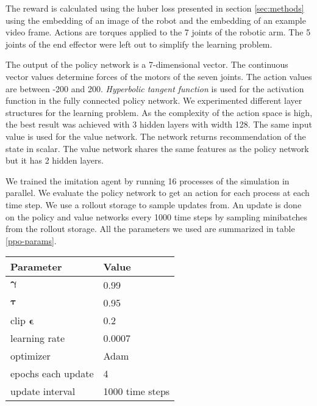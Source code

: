 The reward is calculated using the huber loss presented in section \ref{sec:methods} using the embedding of an image of the robot and the embedding of an example video frame. Actions are torques applied to the 7 joints of the robotic arm. The 5 joints of the end effector were left out to simplify the learning problem.  

The output of the policy network is a 7-dimensional vector. The continuous vector values determine forces of the motors of the seven joints. The action values are between -200 and 200. \textit{Hyperbolic tangent function} is used for the activation function in the fully connected policy network. We experimented different layer structures for the learning problem. As the complexity of the action space is high, the best result was achieved with 3 hidden layers with width 128. The same input value is used for the value network. The network returns recommendation of the state in scalar. The value network shares the same features as the policy network but it has 2 hidden layers.

We trained the imitation agent by running 16 processes of the simulation in parallel. We evaluate the policy network to get an action for each process at each time step. We use a rollout storage to sample updates from. An update is done on the policy and value networks every 1000 time steps by sampling minibatches from the rollout storage. All the parameters we used are summarized in table \ref{ppo-params}.

{
    \vspace{0.5cm}
    \centering
    \begin{tabular}{@{}ll@{}}
    \toprule
    \textbf{Parameter}             & \textbf{Value}    \\ \midrule
    $\boldsymbol{\gamma}$        & 0.99                \\
    $\boldsymbol{\tau}$        & 0.95                \\
    clip $\boldsymbol{\epsilon}$        & 0.2                \\
    learning rate                       & 0.0007 \\
    optimizer                        & Adam \\
    epochs each update        & 4                \\
    update interval        & 1000 time steps                \\
    \end{tabular}
    \label{ppo-params}
}
